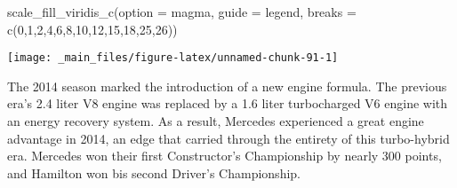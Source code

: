 \documentclass[
]{book}
\newenvironment{Shaded}{\begin{snugshade}}{\end{snugshade}}
\newcommand{\AttributeTok}[1]{\textcolor[rgb]{0.77,0.63,0.00}{#1}}
\newcommand{\DecValTok}[1]{\textcolor[rgb]{0.00,0.00,0.81}{#1}}
\newcommand{\FunctionTok}[1]{\textcolor[rgb]{0.00,0.00,0.00}{#1}}
\newcommand{\NormalTok}[1]{#1}
\newcommand{\StringTok}[1]{\textcolor[rgb]{0.31,0.60,0.02}{#1}}
\begin{document}
\begin{Shaded}
\begin{Highlighting}[]
  \FunctionTok{scale\_fill\_viridis\_c}\NormalTok{(}\AttributeTok{option =} \StringTok{\textquotesingle{}magma\textquotesingle{}}\NormalTok{,}
                       \AttributeTok{guide =} \StringTok{\textquotesingle{}legend\textquotesingle{}}\NormalTok{,}
                       \AttributeTok{breaks =} \FunctionTok{c}\NormalTok{(}\DecValTok{0}\NormalTok{,}\DecValTok{1}\NormalTok{,}\DecValTok{2}\NormalTok{,}\DecValTok{4}\NormalTok{,}\DecValTok{6}\NormalTok{,}\DecValTok{8}\NormalTok{,}\DecValTok{10}\NormalTok{,}\DecValTok{12}\NormalTok{,}\DecValTok{15}\NormalTok{,}\DecValTok{18}\NormalTok{,}\DecValTok{25}\NormalTok{,}\DecValTok{26}\NormalTok{))}
\end{Highlighting}
\end{Shaded}

\begin{center}\texttt{[image: \_main\_files/figure-latex/unnamed-chunk-91-1]} \end{center}

The 2014 season marked the introduction of a new engine formula. The previous era's 2.4 liter V8 engine was replaced by a 1.6 liter turbocharged V6 engine with an energy recovery system. As a result, Mercedes experienced a great engine advantage in 2014, an edge that carried through the entirety of this turbo-hybrid era. Mercedes won their first Constructor's Championship by nearly 300 points, and Hamilton won bis second Driver's Championship.
\end{document}
